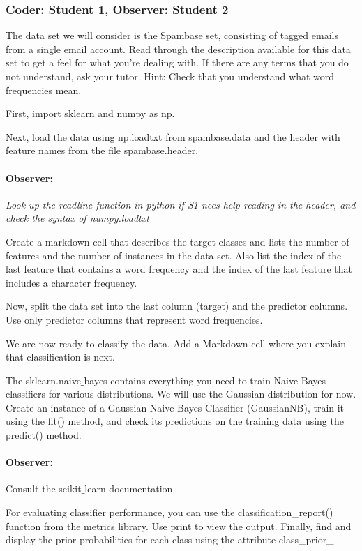 \documentclass{article}
\begin{document}
\subsubsection*{Coder: Student 1, Observer: Student 2}

The data set we will consider is the Spambase set, consisting of tagged emails from a single email account. Read through the description available for this data set to get a feel for what you're dealing with. If there are any terms that you do not understand, ask your tutor. Hint: Check that you understand what word frequencies mean.

First, import sklearn and numpy as np. 

Next, load the data using np.loadtxt from spambase.data and the header with feature names from the file spambase.header.

\paragraph{Observer:} \emph{Look up the readline function in python if S1 nees help reading in the header, and check the syntax of numpy.loadtxt}

Create a markdown cell that describes the target classes and lists the number of features and the number of instances in the data set. Also list the index of the last feature that contains a word frequency and the index of the last feature that includes a character frequency.

Now, split the data set into the last column (target) and the predictor columns. Use only predictor columns that represent word frequencies. 

We are now ready to classify the data. Add a Markdown cell where you explain that classification is next.

The  sklearn.naive$\_$bayes contains everything you need to train Naive Bayes classifiers for various distributions. We will use the Gaussian distribution for now. Create an instance of a Gaussian Naive Bayes Classifier (GaussianNB), train it using the fit() method, and check its predictions on the training data using the predict() method. 

\paragraph{Observer:} Consult the scikit$\_$learn documentation 

For evaluating classifier performance, you can use the classification\_report() function from the metrics library. Use print to view the output. Finally, find and display the prior probabilities for each class using the attribute class\_prior\_. 
\end{document}
